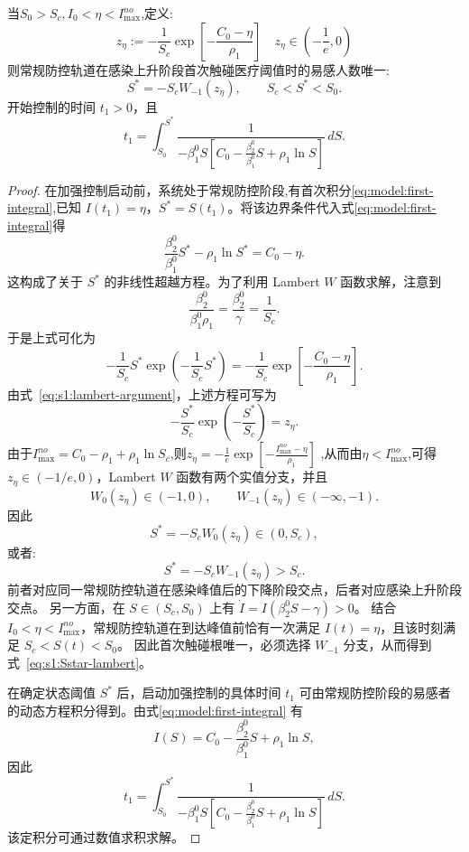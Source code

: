 \documentclass[lang=cn,a4paper,newtx]{elegantpaper}
\numberwithin{equation}{section}
\theoremstyle{plain}
\begin{document}
\begin{theorem}[干预启动点与首次触碰时间]
\label{thm:s1:trigger}
当\(S_0>S_c,I_0<\eta<I_{\max}^{no}\),定义:
\begin{equation}
z_\eta:=
-\frac{1}{S_c}
\exp\left[-\frac{C_0-\eta}{\rho_1}\right] \quad z_\eta\in\left(-\frac{1}{e},0\right)
\label{eq:s1:lambert-argument}
\end{equation}
则常规防控轨道在感染上升阶段首次触碰医疗阈值时的易感人数唯一:
\begin{equation}
S^*=-S_cW_{-1}(z_\eta),
\qquad
S_c<S^*<S_0.
\label{eq:s1:Sstar-lambert}
\end{equation}
开始控制的时间 $t_1>0$，且
\begin{equation}
t_1
=
\int_{S_0}^{S^*}
\frac{1}{
-\beta_1^0S\left[
C_0-\frac{\beta_2^0}{\beta_1^0}S+\rho_1\ln S
\right]
}\,dS.
\label{eq:s1:t1}
\end{equation}
\end{theorem}
\begin{proof}
在加强控制启动前，系统处于常规防控阶段,有首次积分\eqref{eq:model:first-integral},已知 $I(t_1)=\eta$，$S^*=S(t_1)$。将该边界条件代入式\eqref{eq:model:first-integral}得
\[
\frac{\beta_2^0}{\beta_1^0}S^*-\rho_1\ln S^*
=C_0-\eta.
\]
这构成了关于 $S^*$ 的非线性超越方程。为了利用 Lambert $W$ 函数求解，注意到
\[
\frac{\beta_2^0}{\beta_1^0\rho_1}
=
\frac{\beta_2^0}{\gamma}
=
\frac{1}{S_c}.
\]
于是上式可化为
\[
-\frac{1}{S_c}S^*
\exp\left(-\frac{1}{S_c}S^*\right)
=
-\frac{1}{S_c}
\exp\left[-\frac{C_0-\eta}{\rho_1}\right].
\]
由式~\eqref{eq:s1:lambert-argument}，上述方程可写为
\[
-\frac{S^*}{S_c}
\exp\left(-\frac{S^*}{S_c}\right)
=z_\eta.
\]
由于$I_{\max}^{no}=C_0-\rho_1+\rho_1\ln S_c$,则$z_{\eta}=-\frac{1}{e}\exp\left[-\frac{I_{\max}^{no}-\eta}{\rho_1}\right]$ ,从而由$\eta< I_{\max}^{no}$,可得$z_\eta\in(-1/e,0)$，Lambert $W$ 函数有两个实值分支，并且
\[
W_0(z_\eta)\in(-1,0),
\qquad
W_{-1}(z_\eta)\in(-\infty,-1).
\]
因此
\[
S^*=-S_cW_0(z_\eta)\in(0,S_c),
\]
或者:
\[
S^*=-S_cW_{-1}(z_\eta)>S_c.
\]
前者对应同一常规防控轨道在感染峰值后的下降阶段交点，后者对应感染上升阶段交点。
另一方面，在 $S\in(S_c,S_0)$ 上有
$\dot I=I(\beta_2^0S-\gamma)>0$。
结合 $I_0<\eta<I_{\max}^{no}$，常规防控轨道在到达峰值前恰有一次满足
$I(t)=\eta$，且该时刻满足 $S_c<S(t)<S_0$。
因此首次触碰根唯一，必须选择 $W_{-1}$ 分支，从而得到
式~\eqref{eq:s1:Sstar-lambert}。

在确定状态阈值 $S^*$ 后，启动加强控制的具体时间 $t_1$ 可由常规防控阶段的易感者的动态方程积分得到。由式\eqref{eq:model:first-integral} 有
\[
I(S)=
C_0-\frac{\beta_2^0}{\beta_1^0}S+\rho_1\ln S,
\]
因此
\[
t_1
=
\int_{S_0}^{S^*}
\frac{1}{
-\beta_1^0S\left[
C_0-\frac{\beta_2^0}{\beta_1^0}S+\rho_1\ln S
\right]
}\,dS.
\]
该定积分可通过数值求积求解。
\end{proof}
\end{document}

